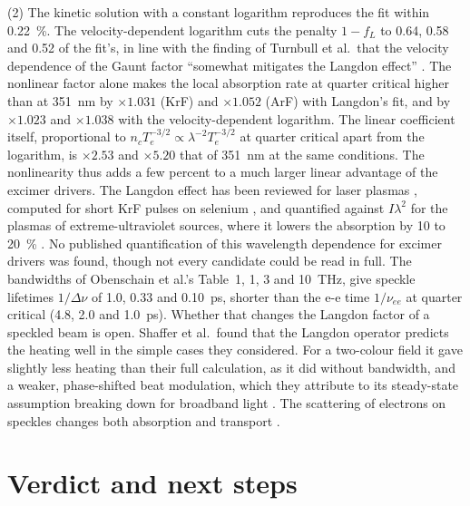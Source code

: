 \documentclass[11pt]{article}
\numberwithin{equation}{section}
\begin{document}
{\noindent}(2) The kinetic solution with a constant logarithm reproduces the fit
within 0.22~\%. The velocity-dependent logarithm cuts the penalty $1-f_L$ to 0.64,
0.58 and 0.52 of the fit's, in line with the finding of Turnbull et al.\ that the
velocity dependence of the Gaunt factor ``somewhat mitigates the Langdon effect''
\cite{Turnbull2024}. The nonlinear factor alone makes the local absorption rate at
quarter critical higher than at 351~nm by $\times1.031$ (KrF) and $\times1.052$ (ArF)
with Langdon's fit, and by $\times1.023$ and $\times1.038$ with the velocity-dependent
logarithm. The linear coefficient itself, proportional to
$n_cT_e^{-3/2}\propto\lambda^{-2}T_e^{-3/2}$ at quarter critical apart from the
logarithm, is $\times2.53$ and $\times5.20$ that of 351~nm at the same conditions. The
nonlinearity thus adds a few percent to a much larger linear advantage of the excimer
drivers. The Langdon effect has been reviewed for laser plasmas \cite{Shaffer2025},
computed for short KrF pulses on selenium \cite{Pulsifer1994}, and quantified against
$I\lambda^2$ for the plasmas of extreme-ultraviolet sources, where it lowers the
absorption by 10 to 20~\% \cite{GonzalezSheil2025}. No published quantification of
this wavelength dependence for excimer drivers was found, though not every candidate
could be read in full. The bandwidths of Obenschain et al.'s
Table~1, 1, 3 and 10~THz, give speckle lifetimes $1/\Delta\nu$ of 1.0, 0.33 and
0.10~ps, shorter than the e-e time $1/\nu_{ee}$ at quarter critical (4.8, 2.0 and
1.0~ps). Whether that changes the Langdon factor of a speckled beam is open. Shaffer
et al.\ found that the Langdon operator predicts the heating well in the simple cases
they considered. For a two-colour field it gave slightly less heating than their full
calculation, as it did without bandwidth, and a weaker, phase-shifted beat modulation,
which they attribute to its steady-state assumption breaking down for broadband light
\cite{Shaffer2023}. The scattering of electrons on speckles changes both absorption
and transport \cite{SherlockMichel2022}.

\section{Verdict and next steps}
\label{sec:verdict}
\end{document}
